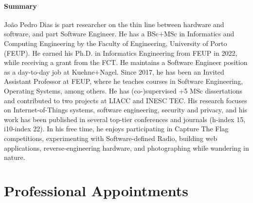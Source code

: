 \documentclass[10pt, a4paper]{article}
\begin{document}
\paragraph{Summary} João Pedro Dias is part researcher on the thin line between hardware and software, and part Software Engineer. He has a BSc+MSc in Informatics and Computing Engineering by the Faculty of Engineering, University of Porto (FEUP). He earned his Ph.D. in Informatics Engineering from FEUP in 2022, while receiving a grant from the FCT. He maintains a Software Engineer position as a day-to-day job at Kuehne$+$Nagel. Since 2017, he has been an Invited Assistant Professor at FEUP, where he teaches courses in Software Engineering, Operating Systems, among others. He has (co-)supervised +5 MSc dissertations and contributed to two projects at LIACC and INESC TEC. His research focuses on Internet-of-Things systems, software engineering, security and privacy, and his work has been published in several top-tier conferences and journals (h-index 15, i10-index 22). In his free time, he enjoys participating in Capture The Flag competitions, experimenting with Software-defined Radio, building web applications, reverse-engineering hardware, and photographing while wandering in nature.
\vspace{-1em}

\section*{Professional Appointments}
\end{document}
